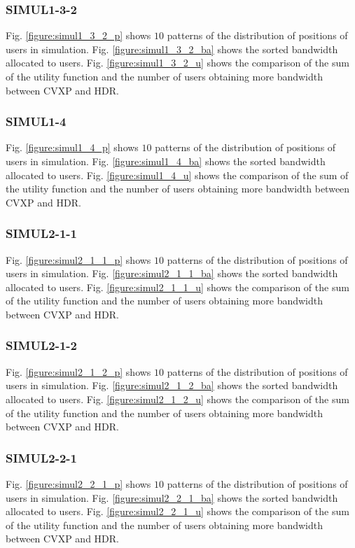 \subsubsection{SIMUL1-3-2}
	Fig. \ref{figure:simul1_3_2_p} shows $10$ patterns of the distribution of positions of users in simulation. Fig. \ref{figure:simul1_3_2_ba} shows the sorted bandwidth allocated to users. Fig. \ref{figure:simul1_3_2_u} shows the comparison of the sum of the utility function and the number of users obtaining more bandwidth between CVXP and HDR.
	
\subsubsection{SIMUL1-4}
	Fig. \ref{figure:simul1_4_p} shows $10$ patterns of the distribution of positions of users in simulation. Fig. \ref{figure:simul1_4_ba} shows the sorted bandwidth allocated to users. Fig. \ref{figure:simul1_4_u} shows the comparison of the sum of the utility function and the number of users obtaining more bandwidth between CVXP and HDR.

\subsubsection{SIMUL2-1-1}
	Fig. \ref{figure:simul2_1_1_p} shows $10$ patterns of the distribution of positions of users in simulation. Fig. \ref{figure:simul2_1_1_ba} shows the sorted bandwidth allocated to users. Fig. \ref{figure:simul2_1_1_u} shows the comparison of the sum of the utility function and the number of users obtaining more bandwidth between CVXP and HDR.
	
\subsubsection{SIMUL2-1-2}
	Fig. \ref{figure:simul2_1_2_p} shows $10$ patterns of the distribution of positions of users in simulation. Fig. \ref{figure:simul2_1_2_ba} shows the sorted bandwidth allocated to users. Fig. \ref{figure:simul2_1_2_u} shows the comparison of the sum of the utility function and the number of users obtaining more bandwidth between CVXP and HDR.
	
\subsubsection{SIMUL2-2-1}
	Fig. \ref{figure:simul2_2_1_p} shows $10$ patterns of the distribution of positions of users in simulation. Fig. \ref{figure:simul2_2_1_ba} shows the sorted bandwidth allocated to users. Fig. \ref{figure:simul2_2_1_u} shows the comparison of the sum of the utility function and the number of users obtaining more bandwidth between CVXP and HDR.
	
